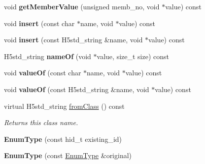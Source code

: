 \begin{DoxyCompactItemize}
void {\bfseries get\+Member\+Value} (unsigned memb\+\_\+no, void $\ast$value) const
\item 
\mbox{\label{class_h5_1_1_enum_type_a7158d518f2be8c2b1478d15cae6d423b}} 
void {\bfseries insert} (const char $\ast$name, void $\ast$value) const
\item 
\mbox{\label{class_h5_1_1_enum_type_a4b7fdea2ad0086bc6af6e04e80de6319}} 
void {\bfseries insert} (const H5std\+\_\+string \&name, void $\ast$value) const
\item 
\mbox{\label{class_h5_1_1_enum_type_a9828fc1ade770262d851704f163a977f}} 
H5std\+\_\+string {\bfseries name\+Of} (void $\ast$value, size\+\_\+t size) const
\item 
\mbox{\label{class_h5_1_1_enum_type_a1f10dd8285464ab53e9e0e4bfe494bde}} 
void {\bfseries value\+Of} (const char $\ast$name, void $\ast$value) const
\item 
\mbox{\label{class_h5_1_1_enum_type_ae0be904778681842777e8d210d9b5f9c}} 
void {\bfseries value\+Of} (const H5std\+\_\+string \&name, void $\ast$value) const
\item 
\mbox{\label{class_h5_1_1_enum_type_aeef68c3a71fb4d3516985007fb3410fd}} 
virtual H5std\+\_\+string \hyperlink{class_h5_1_1_enum_type_aeef68c3a71fb4d3516985007fb3410fd}{from\+Class} () const
\begin{DoxyCompactList}\small\item\em Returns this class name. \end{DoxyCompactList}\item 
\mbox{\label{class_h5_1_1_enum_type_a3fe856011081e8360bd6a81d7567e722}} 
{\bfseries Enum\+Type} (const hid\+\_\+t existing\+\_\+id)
\item 
\mbox{\label{class_h5_1_1_enum_type_a92a6b6c5843284264fdcd878533e7309}} 
{\bfseries Enum\+Type} (const \hyperlink{class_h5_1_1_enum_type}{Enum\+Type} \&original)
\item 
\mbox{\label{class_h5_1_1_enum_type_a38608d554e69b2880e8fcf000523dff8}} 

\end{DoxyCompactItemize}
